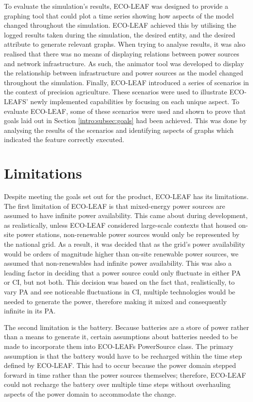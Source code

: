 \documentclass{l4proj}
\begin{document}
To evaluate the simulation's results, ECO-LEAF was designed to provide a graphing tool that could plot a time series showing how aspects of the model changed throughout the simulation.
ECO-LEAF achieved this by utilising the logged results taken during the simulation, the desired entity, and the desired attribute to generate relevant graphs.
When trying to analyse results, it was also realised that there was no means of displaying relations between power sources and network infrastructure.
As such, the animator tool was developed to display the relationship between infrastructure and power sources as the model changed throughout the simulation.
Finally, ECO-LEAF introduced a series of scenarios in the context of precision agriculture.
These scenarios were used to illustrate ECO-LEAFS' newly implemented capabilities by focusing on each unique aspect.
To evaluate ECO-LEAF, some of these scenarios were used and shown to prove that goals laid out in Section \ref{intro:subsec:goals} had been achieved.
This was done by analysing the results of the scenarios and identifying aspects of graphs which indicated the feature correctly executed.
\section{Limitations}
Despite meeting the goals set out for the product, ECO-LEAF has its limitations.
The first limitation of ECO-LEAF is that mixed-energy power sources are assumed to have infinite power availability.
This came about during development, as realistically, unless ECO-LEAF considered large-scale contexts that housed on-site power stations, non-renewable power sources would only be represented by the national grid.
As a result, it was decided that as the grid's power availability would be orders of magnitude higher than on-site renewable power sources, we assumed that non-renewables had infinite power availability.
This was also a leading factor in deciding that a power source could only fluctuate in either PA or CI, but not both.
This decision was based on the fact that, realistically, to vary PA and see noticeable fluctuations in CI, multiple technologies would be needed to generate the power, therefore making it mixed and consequently infinite in its PA.

The second limitation is the battery.
Because batteries are a store of power rather than a means to generate it, certain assumptions about batteries needed to be made to incorporate them into ECO-LEAFs PowerSource class.
The primary assumption is that the battery would have to be recharged within the time step defined by ECO-LEAF.
This had to occur because the power domain stepped forward in time rather than the power sources themselves; therefore, ECO-LEAF could not recharge the battery over multiple time steps without overhauling aspects of the power domain to accommodate the change.
\end{document}

